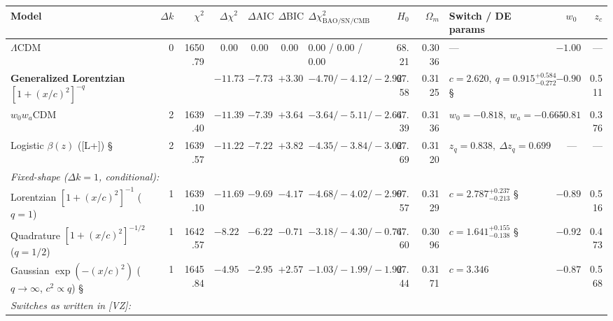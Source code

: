 \documentclass[11pt,a4paper]{article}
\begin{document}
\begin{landscape}
\begin{center}
\begin{adjustbox}{max width=\linewidth}
\begin{tabular}{lrrrrrlrrlrr}
\hline
{}{\bfseries\boldmath Model} & {\bfseries\boldmath $\Delta k$} & {\bfseries\boldmath $\chi^2$} & {\bfseries\boldmath $\Delta\chi^2$} & {\bfseries\boldmath $\Delta\text{AIC}$} & {\bfseries\boldmath $\Delta\text{BIC}$} & {\bfseries\boldmath $\Delta\chi^2_{\text{BAO/SN/CMB}}$} & {\bfseries\boldmath $H_0$} & {\bfseries\boldmath $\Omega_m$} & {\bfseries\boldmath Switch / DE params} & {\bfseries\boldmath $w_0$} & {\bfseries\boldmath $z_c$} \\
\hline
{}$\Lambda$CDM \dag{} & 0 & 1650.79 & 0.00 & 0.00 & 0.00 & 0.00 / 0.00 / 0.00 & 68.21 & 0.3036 & --- & $-1.000$ & --- \\
{}{\bfseries\boldmath Generalized Lorentzian} $[1+(x/c)^2]^{-q}$ \dag{} & {\bfseries\boldmath 2} & {\bfseries\boldmath 1639.06} & {\bfseries\boldmath $-11.73$} & {\bfseries\boldmath $-7.73$} & {\bfseries\boldmath $+3.30$} & $-4.70 / -4.12 / -2.92$ & 67.58 & 0.3125 & $c = 2.620,\ q = 0.915^{+0.584}_{-0.272}$ \S{} & $-0.901$ & 0.511 \\
{}$w_0 w_a$CDM \dag{} & 2 & 1639.40 & $-11.39$ & $-7.39$ & $+3.64$ & $-3.64 / -5.11 / -2.64$ & 67.39 & 0.3136 & $w_0 = -0.818,\ w_a = -0.665$ & $-0.818$ & 0.376 \\
{}Logistic $\beta(z)$ ([L+]) \S{} & 2 & 1639.57 & $-11.22$ & $-7.22$ & $+3.82$ & $-4.35 / -3.84 / -3.02$ & 67.69 & 0.3120 & $z_q = 0.838,\ \Delta z_q = 0.699$ & --- & --- \\
\multicolumn{12}{l}{\emph{Fixed-shape ($\Delta k = 1$, conditional):}} \\
{}Lorentzian $[1+(x/c)^2]^{-1}$ ($q = 1$) \dag{} & 1 & 1639.10 & $-11.69$ & $-9.69$ & $-4.17$ & $-4.68 / -4.02 / -2.99$ & 67.57 & 0.3129 & $c = 2.787^{+0.237}_{-0.213}$ \S{} & $-0.899$ & 0.516 \\
{}Quadrature $[1+(x/c)^2]^{-1/2}$ ($q = 1/2$) \dag{} & 1 & 1642.57 & $-8.22$ & $-6.22$ & $-0.71$ & $-3.18 / -4.30 / -0.74$ & 67.60 & 0.3096 & $c = 1.641^{+0.155}_{-0.138}$ \S{} & $-0.923$ & 0.473 \\
{}Gaussian $\exp(-(x/c)^2)$ ($q \to \infty$, $c^2 \propto q$) \S{} & 1 & 1645.84 & $-4.95$ & $-2.95$ & $+2.57$ & $-1.03 / -1.99 / -1.92$ & 67.44 & 0.3171 & $c = 3.346$ & $-0.875$ & 0.568 \\
\multicolumn{12}{l}{\emph{Switches as written in [VZ]:}} \\

\end{tabular}
\end{adjustbox}
\end{center}
\end{landscape}
\end{document}
